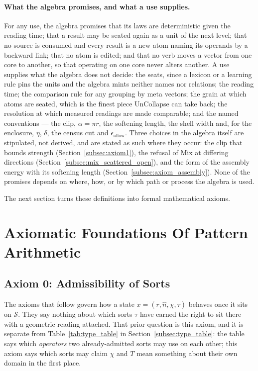 \documentclass[12pt, a4paper]{article}
\begin{document}
\paragraph{What the algebra promises, and what a use supplies.} For any use, the algebra promises that its laws are deterministic given the reading time; that a result may be seated again as a unit of the next level; that no source is consumed and every result is a new atom naming its operands by a backward link; that no atom is edited; and that no verb moves a vector from one core to another, so that operating on one core never alters another. A use supplies what the algebra does not decide: the seats, since a lexicon or a learning rule pins the units and the algebra mints neither names nor relations; the reading time; the comparison rule for any grouping by meta vectors; the grain at which atoms are seated, which is the finest piece UnCollapse can take back; the resolution at which measured readings are made comparable; and the named conventions --- the clip, $\alpha=\pi r$, the softening length, the shell width and, for the enclosure, $\eta$, $\delta$, the census cut and $\epsilon_{\text{allow}}$. Three choices in the algebra itself are stipulated, not derived, and are stated as such where they occur: the clip that bounds strength (Section~\ref{subsec:axiom1}), the refusal of Mix at differing directions (Section~\ref{subsec:mix_scattered_open}), and the form of the assembly energy with its softening length (Section~\ref{subsec:axiom_assembly}). None of the promises depends on where, how, or by which path or process the algebra is used.

The next section turns these definitions into formal mathematical axioms.


\section{Axiomatic Foundations Of Pattern Arithmetic}

\subsection{Axiom 0: Admissibility of Sorts}
\label{subsec:axiom0_admissibility}
The axioms that follow govern how a state $x=(r,\hat n,\chi,\tau)$
behaves once it sits on $\mathcal{S}$. They say nothing about which
sorts $\tau$ have earned the right to sit there with a geometric
reading attached. That prior question is this axiom, and it is
separate from Table~\ref{tab:type_table} in
Section~\ref{subsec:type_table}: the table says which
\emph{operators} two already-admitted sorts may use on each other;
this axiom says which sorts may claim $\chi$ and $T$ mean something
about their own domain in the first place.
\end{document}
